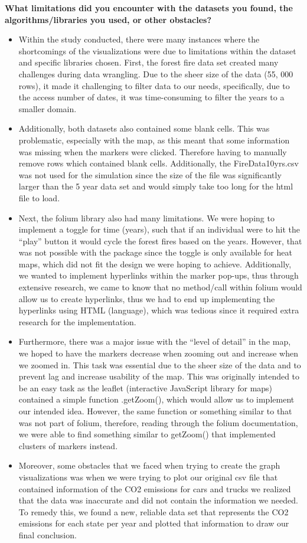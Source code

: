 \documentclass[fontsize=11pt]{article}
\begin{document}
\textbf{What limitations did you encounter with the datasets you found, the algorithms/libraries you used, or other obstacles?}
\begin{itemize}
    \item Within the study conducted, there were many instances where the shortcomings of the visualizations were due to limitations within the dataset and specific libraries chosen. First, the forest fire data set created many challenges during data wrangling. Due to the sheer size of the data (55, 000 rows), it made it challenging to filter data to our needs, specifically, due to the access number of dates, it was time-consuming to filter the years to a smaller domain. 
    \item Additionally, both datasets also contained some blank cells. This was problematic, especially with the map, as this meant that some information was missing when the markers were clicked. Therefore having to manually remove rows which contained blank cells. Additionally, the FireData10yrs.csv was not used for the simulation since the size of the file was significantly larger than the 5 year data set and would simply take too long for the html file to load. \item Next, the folium library also had many limitations. We were hoping to implement a toggle for time (years), such that if an individual were to hit the “play” button it would cycle the forest fires based on the years. However, that was not possible with the package since the toggle is only available for heat maps, which did not fit the design we were hoping to achieve. Additionally, we wanted to implement hyperlinks within the marker pop-ups, thus through extensive research, we came to know that no method/call within folium would allow us to create hyperlinks, thus we had to end up implementing the hyperlinks using HTML (language), which was tedious since it required extra research for the implementation.
    \item Furthermore, there was a major issue with the “level of detail” in the map, we hoped to have the markers decrease when zooming out and increase when we zoomed in. This task was essential due to the sheer size of the data and to prevent lag and increase usability of the map. This was originally intended to be an easy task as the leaflet (interactive JavaScript library for maps) contained a simple function .getZoom(), which would allow us to implement our intended idea. However, the same function or something similar to that was not part of folium, therefore, reading through the folium documentation, we were able to find something similar to getZoom() that implemented clusters of markers instead.
    \item Moreover, some obstacles that we faced when trying to create the graph visualizations was when we were trying to plot our original csv file that contained information of the CO2 emissions for cars and trucks we realized that the data was inaccurate and did not contain the information we needed. To remedy this, we found a new, reliable data set that represents the CO2 emissions for each state per year and plotted that information to draw our final conclusion. 
\end{itemize}
\end{document}
